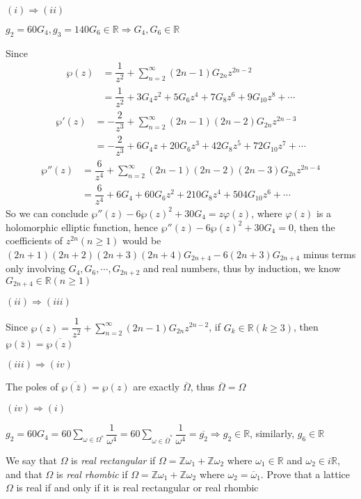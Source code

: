 \documentclass[main]{subfiles}
\begin{document}
\begin{solution}
$(i)\Rightarrow(ii)$ \par
$g_2=60G_4,g_3=140G_6\in\mathbb{R}\Rightarrow G_4,G_6\in\mathbb{R}$ \par
Since
\begin{align*}
\wp(z)&=\dfrac{1}{z^2}+\sum_{n=2}^{\infty}(2n-1)G_{2n}z^{2n-2} \\
&=\dfrac{1}{z^2}+3G_4z^2+5G_6z^4+7G_8z^6+9G_{10}z^8+\cdots
\end{align*}
\begin{align*}
\wp'(z)&=-\dfrac{2}{z^3}+\sum_{n=2}^{\infty}(2n-1)(2n-2)G_{2n}z^{2n-3} \\
&=-\dfrac{2}{z^3}+6G_4z+20G_6z^3+42G_8z^5+72G_{10}z^7+\cdots
\end{align*}
\begin{align*}
\wp''(z)&=\dfrac{6}{z^4}+\sum_{n=2}^{\infty}(2n-1)(2n-2)(2n-3)G_{2n}z^{2n-4} \\
&=\dfrac{6}{z^4}+6G_4+60G_6z^2+210G_8z^4+504G_{10}z^6+\cdots
\end{align*}
So we can conclude $\wp''(z)-6\wp(z)^2+30G_4=z\varphi(z)$, where $\varphi(z)$ is a holomorphic elliptic function, hence $\wp''(z)-6\wp(z)^2+30G_4=0$, then the coefficients of $z^{2n}(n\geq 1)$ would be $(2n+1)(2n+2)(2n+3)(2n+4)G_{2n+4}-6(2n+3)G_{2n+4}$ minus terms only involving $G_4,G_6,\cdots,G_{2n+2}$ and real numbers, thus by induction, we know $G_{2n+4}\in\mathbb{R}(n\geq 1)$ \par
$(ii)\Rightarrow(iii)$ \par
Since $\wp(z)=\dfrac{1}{z^2}+\sum_{n=2}^{\infty}(2n-1)G_{2n}z^{2n-2}$, if $G_k\in\mathbb{R}(k\geq 3)$, then $\wp(\bar{z})=\overline{\wp(z)}$ \par
$(iii)\Rightarrow(iv)$ \par
The poles of $\overline{\wp(\bar{z})}=\wp(z)$ are exactly $\overline{\Omega}$, thus $\overline{\Omega}=\Omega$ \par
$(iv)\Rightarrow(i)$ \par
$\displaystyle g_2=60G_4=60\sum_{\omega\in\Omega^*}\dfrac{1}{\omega^4}=60\sum_{\omega\in\overline{\Omega}^*}\dfrac{1}{\omega^4}=\overline{g_2}\Rightarrow g_2\in\mathbb{R}$, similarly, $g_6\in\mathbb{R}$
\end{solution}

\begin{exercise}
We say that $\Omega$ is {\em real rectangular} if $\Omega = \mathbb Z\omega_1+\mathbb Z\omega_2$ where $\omega_1\in \mathbb R$ and $\omega_2\in i\mathbb R$, and that $\Omega$ is {\em real rhombic} if $\Omega = \mathbb Z\omega_1+\mathbb Z\omega_2$ where $\omega_2 = \overline{\omega}_1$. Prove that a lattice $\Omega$ is real if and only if it is real rectangular or real rhombic
\end{exercise}
\end{document}
